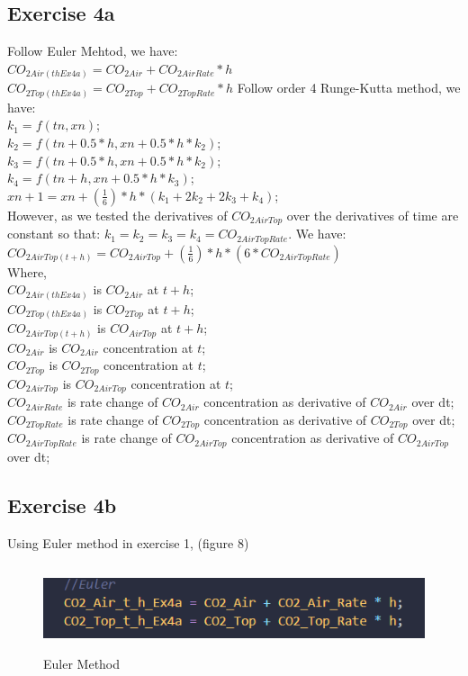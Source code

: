 \subsection{Exercise 4a}
 Follow Euler Mehtod, we have:\\
\indent $CO_{2Air(thEx4a)}=CO_{2Air}+CO_{2AirRate}*h$\\
\indent $CO_{2Top(thEx4a)}=CO_{2Top}+CO_{2TopRate}*h$
 Follow order 4 Runge-Kutta method, we have:\\
\indent $k_{1}=f(tn,xn)$;\\
\indent $k_{2}=f(tn+0.5*h,xn+0.5*h*k_{2})$;\\
\indent $k_{3}=f(tn+0.5*h,xn+0.5*h*k_{2})$;\\
\indent $k_{4}=f(tn+h,xn+0.5*h*k_{3})$;\\
\indent $xn+1=xn+(\frac{1}{6})*h*(k_{1}+2k_{2}+2k_{3}+k_{4})$;\\
 However, as we tested the derivatives of $CO_{2AirTop}$ over the derivatives of time are constant so that: $k_{1}=k_{2}=k_{3}=k_{4}=CO_{2AirTopRate}$. We have:\\
\indent $CO_{2AirTop(t+h)}=CO_{2AirTop}+(\frac{1}{6})*h*(6*CO_{2AirTopRate})$\\
 Where,\\
$CO_{2Air(thEx4a)}$ is $CO_{2Air}$ at $t+h$;\\
$CO_{2Top(thEx4a)}$ is $CO_{2Top}$ at $t+h$;\\
$CO_{2AirTop(t+h)}$ is $CO_{AirTop}$ at $t+h$;\\
$CO_{2Air}$ is $CO_{2Air}$ concentration at $t$;\\
$CO_{2Top}$ is $CO_{2Top}$ concentration at $t$;\\
$CO_{2AirTop}$ is $CO_{2AirTop}$ concentration at $t$;\\
$CO_{2AirRate}$ is rate change of $CO_{2Air}$ concentration as derivative of $CO_{2Air}$ over dt;\\
$CO_{2TopRate}$ is rate change of $CO_{2Top}$ concentration as derivative of $CO_{2Top}$ over dt;\\
$CO_{2AirTopRate}$ is rate change of $CO_{2AirTop}$ concentration as derivative of $CO_{2AirTop}$ over dt;\\














\subsection{Exercise 4b}
Using Euler method in exercise 1, (figure 8)
\begin{figure}[h]
    \includegraphics[width = 5.5in, height = 1in]{Code/Pic/ex4_euler.png}
    \caption{Euler Method}
    \label{fig:my_label}
\end{figure}


